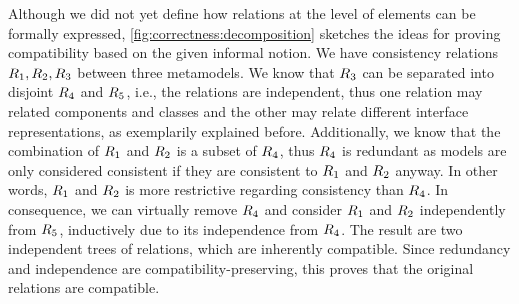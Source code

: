 Although we did not yet define how relations at the level of elements can be formally expressed, \autoref{fig:correctness:decomposition} sketches the ideas for proving compatibility based on the given informal notion.
We have consistency relations $R_{1}, R_{2}, R_{3}$ between three metamodels.
We know that $R_{3}$ can be separated into disjoint $R_{4}$ and $R_{5}$, i.e., the relations are independent, thus one relation may related components and classes and the other may relate different interface representations, as exemplarily explained before.
Additionally, we know that the combination of $R_{1}$ and $R_{2}$ is a subset of $R_{4}$, thus $R_{4}$ is redundant as models are only considered consistent if they are consistent to $R_{1}$ and $R_{2}$ anyway.
In other words, $R_{1}$ and $R_{2}$ is more restrictive regarding consistency than $R_{4}$.
In consequence, we can virtually remove $R_{4}$ and consider $R_{1}$ and $R_{2}$ independently from $R_{5}$, inductively due to its independence from $R_{4}$.
The result are two independent trees of relations, which are inherently compatible.
Since redundancy and independence are compatibility-preserving, this proves that the original relations are compatible.


